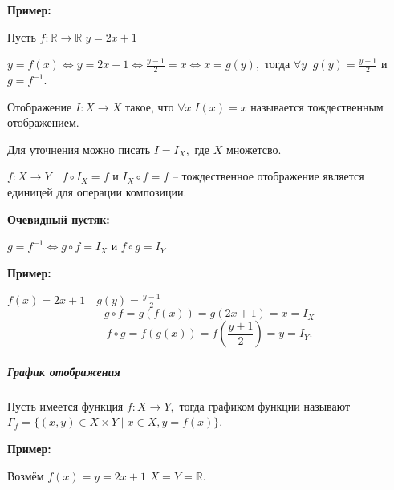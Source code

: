 \par\medskip \textbf{Пример:}\par
Пусть $f:\mathbb{R}\rightarrow\mathbb{R} \; y=2x+1$

$y=f(x) \Leftrightarrow y=2x+1 \Leftrightarrow \frac{y-1}{2}=x \Leftrightarrow x=g(y),$ тогда $\forall y\;\; g(y)=\frac{y-1}{2}$ и $g=f^{-1}.$
\begin{Definition}
Отображение $I:X\rightarrow X$ такое, что $\forall x \; I(x)=x$ называется тождественным отображением.

Для уточнения можно писать $I=I_X,$ где $X$ множетсво.
\end{Definition}

$f:X\rightarrow Y \quad f\circ I_X=f$ и $I_X\circ f=f$ -- тождественное отображение является единицей для операции композиции.

\par\medskip \textbf{Очевидный пустяк:}\par
$g=f^{-1} \Leftrightarrow g\circ f=I_X$ и $f\circ g = I_Y$ 
\par\medskip \textbf{Пример:}\par

$f(x)=2x+1 \quad g(y)=\frac{y-1}{2}$ $$g\circ f=g(f(x))=g(2x+1)=x=I_X$$ $$f\circ g=f(g(x))=f(\frac{y+1}{2})=y=I_Y.$$

\newpage
\subparagraph{График отображения}
Пусть имеется функция $f:X\rightarrow Y,$ тогда графиком функции называют $\Gamma_f=\{(x,y)\in X\times Y\mid x\in X, y=f(x)\}.$
\par\medskip \textbf{Пример:}\par
Возмём $f(x)=y=2x+1$ $X=Y=\mathbb{R}.$ 
\begin{figure}[h!]
\end{figure}

